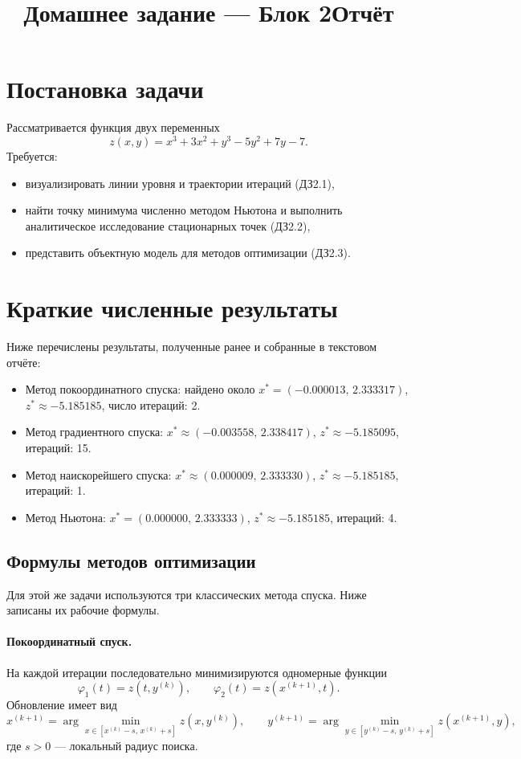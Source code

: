 \documentclass[12pt,a4paper]{article}
\title{Домашнее задание — Блок 2\newline Отчёт}
\date{}
\begin{document}
\maketitle
\tableofcontents
\clearpage

\section{Постановка задачи}
Рассматривается функция двух переменных
\[
z(x,y)=x^{3}+3x^{2}+y^{3}-5y^{2}+7y-7.
\]
Требуется:
\begin{itemize}
  \item визуализировать линии уровня и траектории итераций (ДЗ2.1),
  \item найти точку минимума численно методом Ньютона и выполнить аналитическое исследование стационарных точек (ДЗ2.2),
  \item представить объектную модель для методов оптимизации (ДЗ2.3).
\end{itemize}

\section{Краткие численные результаты}
Ниже перечислены результаты, полученные ранее и собранные в текстовом отчёте:
\begin{itemize}
  \item Метод покоординатного спуска: найдено около $x^*=(-0.000013,\,2.333317)$, $z^*\approx -5.185185$, число итераций: 2.
  \item Метод градиентного спуска: $x^*\approx(-0.003558,\,2.338417)$, $z^*\approx -5.185095$, итераций: 15.
  \item Метод наискорейшего спуска: $x^*\approx(0.000009,\,2.333330)$, $z^*\approx -5.185185$, итераций: 1.
  \item Метод Ньютона: $x^*=(0.000000,\,2.333333)$, $z^*\approx -5.185185$, итераций: 4.
\end{itemize}

\subsection{Формулы методов оптимизации}
Для этой же задачи используются три классических метода спуска. Ниже записаны их рабочие формулы.

\paragraph{Покоординатный спуск.}
На каждой итерации последовательно минимизируются одномерные функции
\[
\varphi_1(t)=z(t,y^{(k)}),\qquad \varphi_2(t)=z(x^{(k+1)},t).
\]
Обновление имеет вид
\[
x^{(k+1)}=\arg\min_{x\in[x^{(k)}-s,\,x^{(k)}+s]} z(x,y^{(k)}),
\qquad
y^{(k+1)}=\arg\min_{y\in[y^{(k)}-s,\,y^{(k)}+s]} z(x^{(k+1)},y),
\]
где $s>0$ — локальный радиус поиска.
\end{document}

